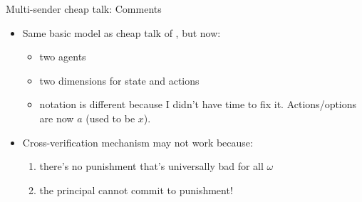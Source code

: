 \documentclass[english,10pt
,aspectratio=169
]{beamer}
\begin{document}
\begin{frame}{Multi-sender cheap talk: Comments}
	\begin{itemize}
		\item Same basic model as cheap talk of \cite{crawford_strategic_1982}, but now:
		\begin{itemize}
			\item two agents
			\item two dimensions for state and actions
			\item notation is different because I didn't have time to fix it. Actions/options are now $a$ (used to be $x$).
		\end{itemize}
		
		\item Cross-verification mechanism may not work because:
		\begin{enumerate}
			\item there's no punishment that's universally bad for all $\omega$
			\item the principal cannot commit to punishment!
		\end{enumerate}
	\end{itemize}
\end{frame}
\end{document}
